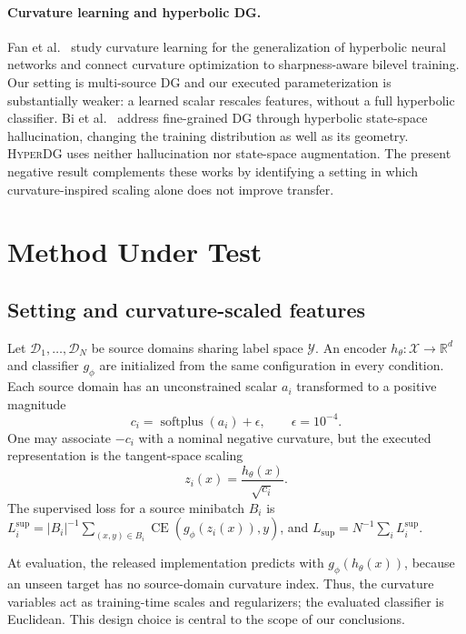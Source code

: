\documentclass[10pt]{article}
\newcommand{\method}{\textsc{HyperDG}}
\begin{document}
\paragraph{Curvature learning and hyperbolic DG.}
Fan et al.\ \citep{fan2025curvaturelearning} study curvature learning for the
generalization of hyperbolic neural networks and connect curvature optimization
to sharpness-aware bilevel training. Our setting is multi-source DG and our
executed parameterization is substantially weaker: a learned scalar rescales
features, without a full hyperbolic classifier. Bi et al.\
\citep{bi2025hyperbolic} address fine-grained DG through hyperbolic state-space
hallucination, changing the training distribution as well as its geometry.
\method{} uses neither hallucination nor state-space augmentation. The present
negative result complements these works by identifying a setting in which
curvature-inspired scaling alone does not improve transfer.

\section{Method Under Test}
\label{sec:method}

\subsection{Setting and curvature-scaled features}

Let $\mathcal{D}_1,\ldots,\mathcal{D}_N$ be source domains sharing label space
$\mathcal{Y}$. An encoder $h_\theta:\mathcal{X}\rightarrow\mathbb{R}^d$ and
classifier $g_\phi$ are initialized from the same configuration in every
condition. Each source domain has an unconstrained scalar $a_i$ transformed to
a positive magnitude
\begin{equation}
    c_i = \operatorname{softplus}(a_i)+\epsilon,
    \qquad \epsilon=10^{-4}.
\end{equation}
One may associate $-c_i$ with a nominal negative curvature, but the executed
representation is the tangent-space scaling
\begin{equation}
    z_i(x)=\frac{h_\theta(x)}{\sqrt{c_i}}.
    \label{eq:tangent-scale}
\end{equation}
The supervised loss for a source minibatch $B_i$ is
$L_i^{\mathrm{sup}}=|B_i|^{-1}\sum_{(x,y)\in B_i}
\operatorname{CE}(g_\phi(z_i(x)),y)$, and
$L_{\mathrm{sup}}=N^{-1}\sum_i L_i^{\mathrm{sup}}$.

At evaluation, the released implementation predicts with
$g_\phi(h_\theta(x))$, because an unseen target has no source-domain curvature
index. Thus, the curvature variables act as training-time scales and
regularizers; the evaluated classifier is Euclidean. This design choice is
central to the scope of our conclusions.
\end{document}
